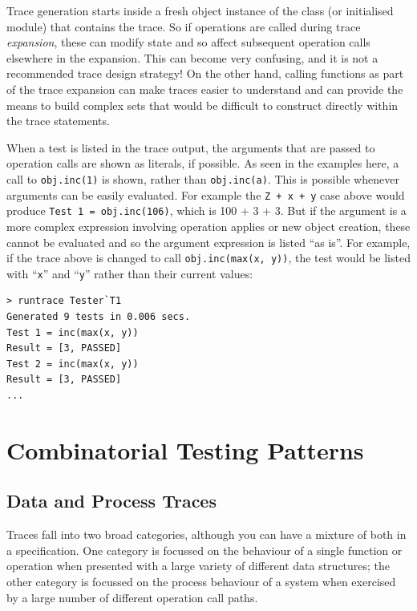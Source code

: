 \documentclass{overturerepchap}
\begin{document}
Trace generation starts inside a fresh object instance of the class (or
initialised module) that contains the trace. So if operations are called during
trace \emph{expansion}, these can modify state and so affect subsequent
operation calls elsewhere in the expansion. This can become very confusing, and
it is not a recommended trace design strategy! On the other hand, calling
functions as part of the trace expansion can make traces easier to understand
and can provide the means to build complex sets that would be difficult to
construct directly within the trace statements.

When a test is listed in the trace output, the arguments that are passed to
operation calls are shown as literals, if possible. As seen in the examples
here, a call to \texttt{obj.inc(1)} is shown, rather than \texttt{obj.inc(a)}. This is
possible whenever arguments can be easily evaluated. For example the \texttt{Z
+ x + y} case above would produce \texttt{Test 1 = obj.inc(106)}, which is 100 +
3 + 3. But if the argument is a more complex expression involving operation
applies or new object creation, these cannot be evaluated and so the argument
expression is listed ``as is''. For example, if the trace above is changed to
call \texttt{obj.inc(max(x, y))}, the test would be listed with ``\texttt{x}''
and ``\texttt{y}'' rather than their current values:

\small
\lstset{style=tool,language=}
\begin{lstlisting}[escapechar=@]
> runtrace Tester`T1
Generated 9 tests in 0.006 secs. 
Test 1 = inc(max(x, y))
Result = [3, PASSED]
Test 2 = inc(max(x, y))
Result = [3, PASSED]
...
\end{lstlisting}
\lstset{style=mystyle}
\lstset{language=VDM++}
\normalsize

\chapter{Combinatorial Testing Patterns}
\label{chap:patterns}

\section{Data and Process Traces}
\label{chap:dataprocess}

Traces fall into two broad categories, although you can have a mixture
of both in a specification. One category is focussed on the behaviour of a
single function or operation when presented with a large variety of different
data structures; the other category is focussed on the process behaviour of a
system when exercised by a large number of different operation call paths.
\end{document}
